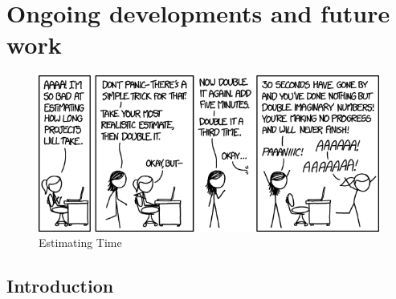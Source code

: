 \chapter{Ongoing developments and future work}
\label{chap:future_work}

\begin{figure}[H]
    \centering
    \includegraphics[width=\textwidth]{figures/estimating_time.png}
    \caption{Estimating Time \cite{xkcdEstimatingTime2016}}
    \label{fig:xkcd_time}
\end{figure}

\section{Introduction}



